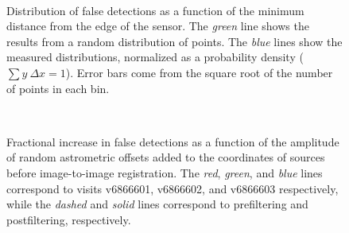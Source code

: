 \documentclass[prd, nofootinbib, floatfix, 11pt,tightenlines,times]{article}
\begin{document}
\begin{figure}
 \\
\caption{Distribution of false detections as a function of the minimum
  distance from the edge of the sensor.  The {\it green} line shows
  the results from a random distribution of points.  The {\it blue}
  lines show the measured distributions, normalized as a probability
  density ($\sum y~\Delta x = 1$).  Error bars come from the square
  root of the number of points in each bin. }
\label{edgedist}
\end{figure}


\begin{figure}
 \\
\caption{Fractional increase in false detections as a function of the
  amplitude of random astrometric offsets added to the coordinates of
  sources before image-to-image registration.  The {\it red}, {\it
    green}, and {\it blue} lines correspond to visits v6866601,
  v6866602, and v6866603 respectively, while the {\it dashed} and {\it
    solid} lines correspond to prefiltering and postfiltering,
  respectively.}
\label{wcsrms}
\end{figure}
\end{document}
